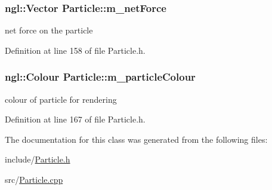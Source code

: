 \hypertarget{class_particle_ad328d5b0f44818766286c928e436d36c}{
\subsubsection[{m\_\-netForce}]{\setlength{\rightskip}{0pt plus 5cm}ngl::Vector {\bf Particle::m\_\-netForce}}}
\label{class_particle_ad328d5b0f44818766286c928e436d36c}


net force on the particle 



Definition at line 158 of file Particle.h.

\hypertarget{class_particle_a8c2475846190984cc19c9b3b0b668870}{
\subsubsection[{m\_\-particleColour}]{\setlength{\rightskip}{0pt plus 5cm}ngl::Colour {\bf Particle::m\_\-particleColour}}}
\label{class_particle_a8c2475846190984cc19c9b3b0b668870}


colour of particle for rendering 



Definition at line 167 of file Particle.h.



The documentation for this class was generated from the following files:\begin{DoxyCompactItemize}
\item 
include/\hyperlink{_particle_8h}{Particle.h}\item 
src/\hyperlink{_particle_8cpp}{Particle.cpp}\end{DoxyCompactItemize}
